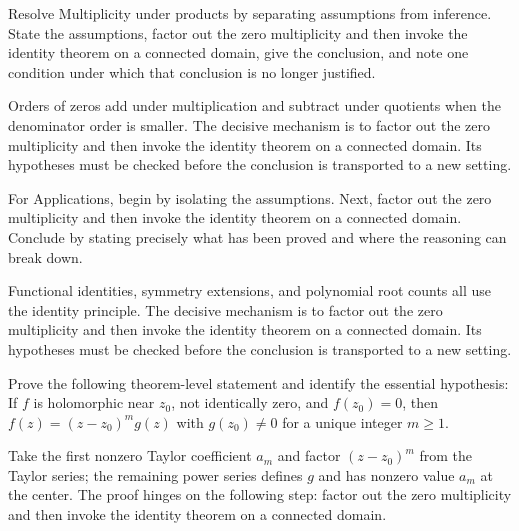\begin{problem}\label{prob:iv07-problem-07}
Resolve Multiplicity under products by separating assumptions from inference. State the assumptions, factor out the zero multiplicity and then invoke the identity theorem on a connected domain, give the conclusion, and note one condition under which that conclusion is no longer justified.
\end{problem}
\begin{solution}
Orders of zeros add under multiplication and subtract under quotients when the denominator order is smaller. The decisive mechanism is to factor out the zero multiplicity and then invoke the identity theorem on a connected domain. Its hypotheses must be checked before the conclusion is transported to a new setting.
\end{solution}

\begin{problem}\label{prob:iv07-problem-08}
For Applications, begin by isolating the assumptions. Next, factor out the zero multiplicity and then invoke the identity theorem on a connected domain. Conclude by stating precisely what has been proved and where the reasoning can break down.
\end{problem}
\begin{solution}
Functional identities, symmetry extensions, and polynomial root counts all use the identity principle. The decisive mechanism is to factor out the zero multiplicity and then invoke the identity theorem on a connected domain. Its hypotheses must be checked before the conclusion is transported to a new setting.
\end{solution}

\begin{problem}\label{prob:iv07-problem-09}
Prove the following theorem-level statement and identify the essential hypothesis: If $f$ is holomorphic near $z_0$, not identically zero, and $f(z_0)=0$, then $f(z)=(z-z_0)^mg(z)$ with $g(z_0)\ne0$ for a unique integer $m\ge1$.
\end{problem}
\begin{solution}
Take the first nonzero Taylor coefficient $a_m$ and factor $(z-z_0)^m$ from the Taylor series; the remaining power series defines $g$ and has nonzero value $a_m$ at the center. The proof hinges on the following step: factor out the zero multiplicity and then invoke the identity theorem on a connected domain.
\end{solution}

